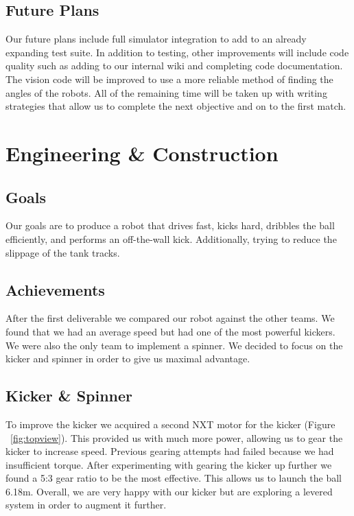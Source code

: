 \documentclass[12pt, a4paper, titlepage]{article}
\begin{document}
\subsection{Future Plans}

Our future plans include full simulator integration to add to an already
expanding test suite. In addition to testing, other improvements will
include code quality such as adding to our internal wiki and completing code
documentation. The vision code will be improved to use a more reliable method
of finding the angles of the robots. All of the remaining time will be taken up
with writing strategies that allow us to complete the next objective and on to
the first match.

\section{Engineering \& Construction}

\subsection{Goals}

Our goals are to produce a robot that drives fast, kicks hard, dribbles the ball
efficiently, and performs an off-the-wall kick. Additionally, trying to reduce the
slippage of the tank tracks.

\subsection{Achievements}

After the first deliverable we compared our robot against the other teams. We
found that we had an average speed but had one of the most powerful kickers.
We were also the only team to implement a spinner. We decided to focus on the
kicker and spinner in order to give us maximal advantage.

\subsection{Kicker \& Spinner}

To improve the kicker we acquired a second NXT motor for the kicker (Figure
~\ref{fig:topview}). This provided us with much more power, allowing us to gear
the kicker to increase speed. Previous gearing attempts had failed because we
had insufficient torque. After experimenting with gearing the kicker up further
we found a 5:3 gear ratio to be the most effective. This allows us to launch the
ball 6.18m. Overall, we are very happy with our kicker but are exploring a
levered system in order to augment it further.
\end{document}
